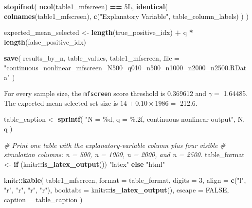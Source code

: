 \documentclass[
]{article}
\newenvironment{Shaded}{\begin{snugshade}}{\end{snugshade}}
\newcommand{\AttributeTok}[1]{\textcolor[rgb]{0.13,0.29,0.53}{#1}}
\newcommand{\CommentTok}[1]{\textcolor[rgb]{0.56,0.35,0.01}{\textit{#1}}}
\newcommand{\ConstantTok}[1]{\textcolor[rgb]{0.56,0.35,0.01}{#1}}
\newcommand{\ControlFlowTok}[1]{\textcolor[rgb]{0.13,0.29,0.53}{\textbf{#1}}}
\newcommand{\DataTypeTok}[1]{\textcolor[rgb]{0.13,0.29,0.53}{#1}}
\newcommand{\DecValTok}[1]{\textcolor[rgb]{0.00,0.00,0.81}{#1}}
\newcommand{\FunctionTok}[1]{\textcolor[rgb]{0.13,0.29,0.53}{\textbf{#1}}}
\newcommand{\NormalTok}[1]{#1}
\newcommand{\OtherTok}[1]{\textcolor[rgb]{0.56,0.35,0.01}{#1}}
\newcommand{\SpecialCharTok}[1]{\textcolor[rgb]{0.81,0.36,0.00}{\textbf{#1}}}
\newcommand{\StringTok}[1]{\textcolor[rgb]{0.31,0.60,0.02}{#1}}
\begin{document}
\begin{Shaded}
\begin{Highlighting}[]
\FunctionTok{stopifnot}\NormalTok{(}
  \FunctionTok{ncol}\NormalTok{(table1\_mfscreen) }\SpecialCharTok{==} \DecValTok{5}\DataTypeTok{L}\NormalTok{,}
  \FunctionTok{identical}\NormalTok{(}
    \FunctionTok{colnames}\NormalTok{(table1\_mfscreen),}
    \FunctionTok{c}\NormalTok{(}\StringTok{"Explanatory Variable"}\NormalTok{, table\_column\_labels)}
\NormalTok{  )}
\NormalTok{)}

\NormalTok{expected\_mean\_selected }\OtherTok{\textless{}{-}} \FunctionTok{length}\NormalTok{(true\_positive\_idx) }\SpecialCharTok{+}
\NormalTok{  q }\SpecialCharTok{*} \FunctionTok{length}\NormalTok{(false\_positive\_idx)}

\FunctionTok{save}\NormalTok{(}
\NormalTok{  results\_by\_n,}
\NormalTok{  table\_values,}
\NormalTok{  table1\_mfscreen,}
  \AttributeTok{file =} \StringTok{"continuous\_nonlinear\_mfscreen\_N500\_q010\_n500\_n1000\_n2000\_n2500.RData"}
\NormalTok{)}
\end{Highlighting}
\end{Shaded}

For every sample size, the \texttt{mfscreen} score threshold is 0.369612
and \(\gamma=\) 1.64485. The expected mean selected-set size is
\(14 + 0.10 \times 1986 =\) 212.6.

\begin{Shaded}
\begin{Highlighting}[]
\NormalTok{table\_caption }\OtherTok{\textless{}{-}} \FunctionTok{sprintf}\NormalTok{(}
  \StringTok{"N = \%d, q = \%.2f, continuous nonlinear output"}\NormalTok{,}
\NormalTok{  N,}
\NormalTok{  q}
\NormalTok{)}

\CommentTok{\# Print one table with the explanatory{-}variable column plus four visible}
\CommentTok{\# simulation columns: n = 500, n = 1000, n = 2000, and n = 2500.}
\NormalTok{table\_format }\OtherTok{\textless{}{-}} \ControlFlowTok{if}\NormalTok{ (knitr}\SpecialCharTok{::}\FunctionTok{is\_latex\_output}\NormalTok{()) }\StringTok{"latex"} \ControlFlowTok{else} \StringTok{"html"}

\NormalTok{knitr}\SpecialCharTok{::}\FunctionTok{kable}\NormalTok{(}
\NormalTok{  table1\_mfscreen,}
  \AttributeTok{format =}\NormalTok{ table\_format,}
  \AttributeTok{digits =} \DecValTok{3}\NormalTok{,}
  \AttributeTok{align =} \FunctionTok{c}\NormalTok{(}\StringTok{"l"}\NormalTok{, }\StringTok{"r"}\NormalTok{, }\StringTok{"r"}\NormalTok{, }\StringTok{"r"}\NormalTok{, }\StringTok{"r"}\NormalTok{),}
  \AttributeTok{booktabs =}\NormalTok{ knitr}\SpecialCharTok{::}\FunctionTok{is\_latex\_output}\NormalTok{(),}
  \AttributeTok{escape =} \ConstantTok{FALSE}\NormalTok{,}
  \AttributeTok{caption =}\NormalTok{ table\_caption}
\NormalTok{)}
\end{Highlighting}
\end{Shaded}
\end{document}
